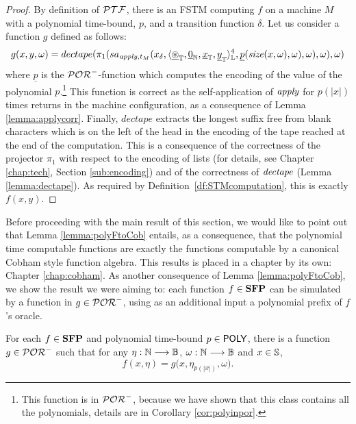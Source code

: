 \polyFtoCob*
\begin{proof}
%
By definition of $\mathcal{PTF}$,
there is an FSTM computing $f$ on a machine $M$ with a polynomial
time-bound, $p$, and a transition function $\delta$.
%
Let us consider a function $g$
defined as follows:
$$
g(x, y, \omega) = dectape(\pi_{1}(sa_{\mathit{apply}, t_M}(x_\delta,
\langle {\underline{\circledast}}_{\mathbb{T}}, \underline{0}_{\mathbb{N}}, {\underline{x}}_{\mathbb{T}}, {\underline{y}}_{\mathbb{T}}\rangle_{\mathbb{L}}^4,
\underline p(\mathit{size}(x, \omega), \omega), \omega), \omega), \omega)
$$
where $\underline p$ is the $\mathcal{POR}^-$-function which
computes the encoding of the value of the polynomial $p$.\footnote{
This function is in $\mathcal{POR}^-$, because we have shown that this class
contains all the polynomials, details are in Corollary \ref{cor:polyinpor}.}
This function is correct as the self-application of $\mathit{apply}$ for $p(|x|)$
times returns in the machine configuration, as a consequence of Lemma \ref{lemma:applycorr}.
Finally, $\mathit{dectape}$
extracts the longest suffix free from blank characters
which is on the left of the head
in the encoding of the tape reached at the end of the computation.
This is a consequence of the correctness of the projector $\pi_1$
with respect to the encoding of lists
(for details, see Chapter \ref{chap:tech}, Section \ref{sub:encoding})
and of the correctness of $\mathit{dectape}$ (Lemma \ref{lemma:dectape}).
As required by Definition~\ref{df:STMcomputation}, this is exactly $f(x, y)$.
\end{proof}
%
%
%
%
%
\noindent
Before proceeding with the main result of this section, we would like to
point out that Lemma \ref{lemma:polyFtoCob} entails, as a consequence, that the
polynomial time computable functions are exactly the functions computable by a
canonical Cobham style function algebra. This results is placed in a chapter by its own: Chapter \ref{chap:cobham}.
%
As another consequence of Lemma \ref{lemma:polyFtoCob},
we show the result we were aiming to:
each function $f \in \mathbf{SFP}$ can be simulated by a function in $g\in \mathcal{POR}^-$,
using as an additional input a polynomial prefix of $f$'s oracle.

\begin{cor}
  \label{cor:sfptopor-}
For each $f\in \mathbf{SFP}$ and polynomial
time-bound $p\in \mathsf{POLY}$,
there is a function $g\in \mathcal{POR}^-$ such that
for any $\eta : \mathbb{N} \longrightarrow \mathbb{B}$, $\omega : \mathbb{N} \longrightarrow \mathbb{B}$ and $x\in\mathbb{S}$,
$$
f(x,\eta) = g\big(x,\eta_{p(|x|)}, \omega\big).
$$
\end{cor}


